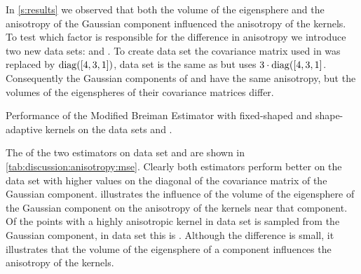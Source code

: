 	In \cref{s:results} we observed that both the volume of the eigensphere and the anisotropy of the Gaussian component influenced the anisotropy of the kernels. To test which factor is responsible for the difference in anisotropy we introduce two new data sets: \anisotropyOne and \anisotropyTwo.
	To create data set \anisotropyOne the covariance matrix used in \ferdosiOne was replaced by $\operatorname{diag}([4, 3, 1])$, data set \anisotropyTwo is the same as \anisotropyOne but uses $3 \cdot \operatorname{diag}([4, 3, 1]$.
	Consequently the Gaussian components of \anisotropyOne and \anisotropyTwo have the same anisotropy, but the volumes of the eigenspheres of their covariance matrices differ.
	\begin{table}
		\centering
		
		\caption{Performance of the Modified Breiman Estimator with fixed-shaped and shape-adaptive kernels on the data sets \anisotropyOne and \anisotropyTwo.} 	
		\label{tab:discussion:anisotropy:mse}
	\end{table}
	The \mses of the two estimators on data set \anisotropyOne and \anisotropyTwo are shown in \cref{tab:discussion:anisotropy:mse}. Clearly both estimators perform better on the data set with higher values on the diagonal of the covariance matrix of the Gaussian component.
	 illustrates the influence of the volume of the eigensphere of the Gaussian component on the anisotropy of the kernels near that component. Of the points with a highly anisotropic kernel in data set \anisotropyOne {} is sampled from the Gaussian component, in data set \anisotropyTwo this is . Although the difference is small, it illustrates that the volume of the eigensphere of a component influences the anisotropy of the kernels. 
